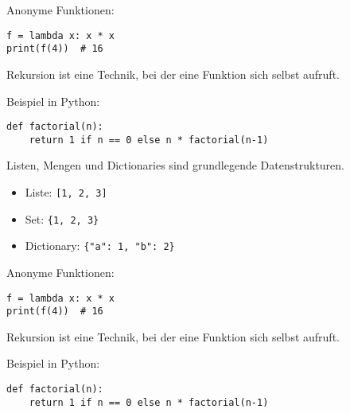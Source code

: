 \documentclass[
]{article}
\providecommand{\tightlist}{%
  \setlength{\itemsep}{0pt}\setlength{\parskip}{0pt}}\usepackage{longtable,booktabs,array}
\newenvironment{cheatboxparacol}{\par\vspace{2pt}\noindent\begin{tcolorbox}[enhanced, sharp corners, colback=gray!5]}{\end{tcolorbox}\vspace{2pt}}
\begin{document}
\begin{cheatboxparacol}

Anonyme Funktionen:

\begin{verbatim}
f = lambda x: x * x
print(f(4))  # 16
\end{verbatim}

\end{cheatboxparacol}

\newpage 
\newpage 
\newpage

\newpage{}

\newpage{}

\newpage{}

\begin{cheatboxparacol}

Rekursion ist eine Technik, bei der eine Funktion sich selbst aufruft.

Beispiel in Python:

\begin{verbatim}
def factorial(n):
    return 1 if n == 0 else n * factorial(n-1)
\end{verbatim}

\end{cheatboxparacol}

\begin{cheatboxparacol}

Listen, Mengen und Dictionaries sind grundlegende Datenstrukturen.

\begin{itemize}
\tightlist
\item
  Liste: \texttt{{[}1,\ 2,\ 3{]}}
\item
  Set: \texttt{\{1,\ 2,\ 3\}}
\item
  Dictionary: \texttt{\{"a":\ 1,\ "b":\ 2\}}
\end{itemize}

\end{cheatboxparacol}

\begin{cheatboxparacol}

Anonyme Funktionen:

\begin{verbatim}
f = lambda x: x * x
print(f(4))  # 16
\end{verbatim}

\end{cheatboxparacol}

\begin{cheatboxparacol}

Rekursion ist eine Technik, bei der eine Funktion sich selbst aufruft.

Beispiel in Python:

\begin{verbatim}
def factorial(n):
    return 1 if n == 0 else n * factorial(n-1)
\end{verbatim}

\end{cheatboxparacol}
\end{document}
